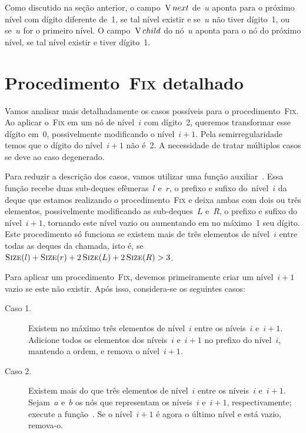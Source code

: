 \documentclass[main.tex]{subfiles}
\begin{document}
Como discutido na seção anterior, o campo~$\operatorname{V}{next}$ de~$u$ aponta para o próximo nível com dígito diferente de~1, se tal nível existir e se~$u$ não tiver dígito~1, ou se~$u$ for o primeiro nível. O campo~$\operatorname{V}{child}$ do nó~$u$ aponta para o nó do próximo nível, se tal nível existir e tiver dígito~1.

\section{Procedimento~{\normalfont \textsc{Fix}} detalhado} \label{sec:fix_det}

Vamos analisar mais detalhadamente os casos possíveis para o procedimento~\textsc{Fix}. Ao aplicar o~\textsc{Fix} em um nó de nível~$i$ com dígito~2, queremos transformar esse dígito em~0, possivelmente modificando o nível~$i+1$. Pela semirregularidade temos que o dígito do nível~${i+1}$ não é~2. A necessidade de tratar múltiplos casos se deve ao caso degenerado.

Para reduzir a descrição dos casos, vamos utilizar uma função auxiliar~. Essa função recebe duas sub-deques efêmeras~$l$ e~$r$, o prefixo e sufixo do~nível~$i$ da deque que estamos realizando o procedimento~\textsc{Fix} e deixa ambas com dois ou três elementos, possivelmente modificando as sub-deques~$L$ e~$R$, o prefixo e sufixo do nível~${i+1}$, tornando este nível vazio ou aumentando em no máximo~1 seu dígito. Este procedimento só funciona se existem mais de três elementos de nível~$i$ entre todas as deques da chamada, isto é, se~${\Call{Size}{l} + \Call{Size}{r} + 2\,\Call{Size}{L} + 2\,\Call{Size}{R} > 3}$.

Para aplicar um procedimento~\textsc{Fix}, devemos primeiramente criar um nível~$i+1$ vazio se este não existir. Após isso, considera-se os seguintes casos:

\begin{description}
    \item[Caso 1.] Existem no máximo três elementos de nível~$i$ entre os níveis~$i$ e~$i+1$. \\ Adicione todos os elementos dos níveis~$i$ e~${i+1}$ no prefixo do nível~$i$, mantendo a ordem, e remova o nível~$i+1$.
    \item[Caso 2.] Existem mais do que três elementos de nível~$i$ entre os níveis~$i$ e~${i+1}$. \\ Sejam~$a$ e~$b$ os nós que representam os níveis~$i$ e~${i+1}$, respectivamente; execute a função~. Se o nível~$i+1$ é agora o último nível e está vazio, remova-o.
\end{description}
\end{document}
